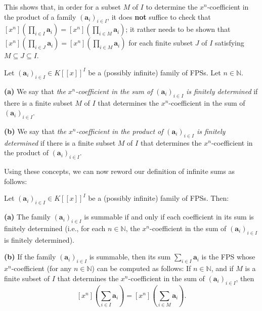 \begin{example}
This shows that, in order for a subset $M$ of $I$ to determine the $x^{n}%
$-coefficient in the product of a family $\left(  \mathbf{a}_{i}\right)
_{i\in I}$, it does \textbf{not} suffice to check that $\left[  x^{n}\right]
\left(  \prod_{i\in I}\mathbf{a}_{i}\right)  =\left[  x^{n}\right]  \left(
\prod_{i\in M}\mathbf{a}_{i}\right)  $; it rather needs to be shown that
$\left[  x^{n}\right]  \left(  \prod_{i\in J}\mathbf{a}_{i}\right)  =\left[
x^{n}\right]  \left(  \prod_{i\in M}\mathbf{a}_{i}\right)  $ for each finite
subset $J$ of $I$ satisfying $M\subseteq J\subseteq I$.
\end{example}

\begin{definition}
\label{def.fps.xn-coeff-fin-determined}Let $\left(  \mathbf{a}_{i}\right)
_{i\in I}\in K\left[  \left[  x\right]  \right]  ^{I}$ be a (possibly
infinite) family of FPSs. Let $n\in\mathbb{N}$. \medskip

\textbf{(a)} We say that \emph{the }$x^{n}$\emph{-coefficient in the sum of
}$\left(  \mathbf{a}_{i}\right)  _{i\in I}$\emph{ is finitely determined} if
there is a finite subset $M$ of $I$ that determines the $x^{n}$-coefficient in
the sum of $\left(  \mathbf{a}_{i}\right)  _{i\in I}$. \medskip

\textbf{(b)} We say that \emph{the }$x^{n}$\emph{-coefficient in the product
of }$\left(  \mathbf{a}_{i}\right)  _{i\in I}$\emph{ is finitely determined}
if there is a finite subset $M$ of $I$ that determines the $x^{n}$-coefficient
in the product of $\left(  \mathbf{a}_{i}\right)  _{i\in I}$.
\end{definition}

Using these concepts, we can now reword our definition of infinite sums as follows:

\begin{proposition}
\label{prop.fps.summable=fin-det}Let $\left(  \mathbf{a}_{i}\right)  _{i\in
I}\in K\left[  \left[  x\right]  \right]  ^{I}$ be a (possibly infinite)
family of FPSs. Then: \medskip

\textbf{(a)} The family $\left(  \mathbf{a}_{i}\right)  _{i\in I}$ is summable
if and only if each coefficient in its sum is finitely determined (i.e., for
each $n\in\mathbb{N}$, the $x^{n}$-coefficient in the sum of $\left(
\mathbf{a}_{i}\right)  _{i\in I}$ is finitely determined). \medskip

\textbf{(b)} If the family $\left(  \mathbf{a}_{i}\right)  _{i\in I}$ is
summable, then its sum $\sum_{i\in I}\mathbf{a}_{i}$ is the FPS whose $x^{n}%
$-coefficient (for any $n\in\mathbb{N}$) can be computed as follows: If
$n\in\mathbb{N}$, and if $M$ is a finite subset of $I$ that determines the
$x^{n}$-coefficient in the sum of $\left(  \mathbf{a}_{i}\right)  _{i\in I}$,
then
\[
\left[  x^{n}\right]  \left(  \sum_{i\in I}\mathbf{a}_{i}\right)  =\left[
x^{n}\right]  \left(  \sum_{i\in M}\mathbf{a}_{i}\right)  .
\]

\end{proposition}

